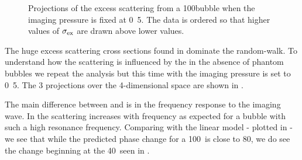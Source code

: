 


 \begin{figure}
  \begin{minipage}{\textwidth}
   \begin{center}
      \begin{narrow}{0cm}{-1cm}
        \subfloat[]{
     \label{fig:projection_short:dr_fr}
     } 
  \subfloat[]{
    \label{fig:projection_short:im_fr}
    }
  \end{narrow}
  \begin{narrow}{-1cm}{-1cm}
\subfloat[]{
     \label{fig:projection_short:dr_amp}
     }
    \caption{Projections of the excess scattering from a \unit{100}\nano\metre bubble when the imaging pressure is fixed at \unit{0.5}\mega\pascal.
      The data is ordered so that higher values of $\sigma_\textrm{ex}$ are drawn above lower values.
   }
   \label{fig:projections_short}
 \end{narrow}
 \end{center}
  \end{minipage}
 \end{figure}

The huge excess scattering cross sections found in 
dominate the random-walk.
To understand how the scattering is influenced by the in the absence of phantom bubbles we 
repeat the analysis but this time with the imaging pressure is set to \unit{0.5}\mega\pascal.
The 3 projections over the 4-dimensional space are shown in .

The main difference between  and  
is in the frequency response to the imaging wave.
In  the scattering increases with frequency 
as expected for a bubble with such a high resonance frequency.
Comparing with the linear model - plotted in  - 
we see that while the predicted phase change for a \unit{100}\nano\metre\ is close to \unit{80}\mega\hertz, 
we do see the change beginning at the \unit{40}\mega\hertz\ seen in . 

